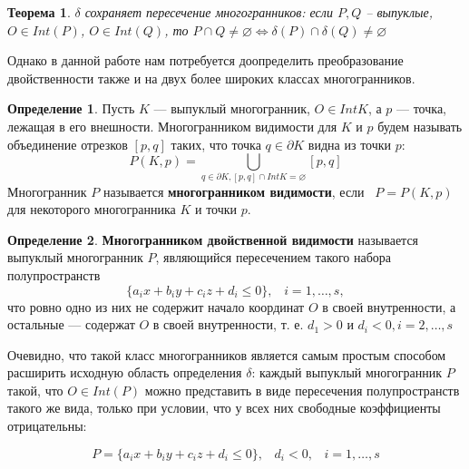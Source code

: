 \documentclass[a4paper, 10pt]{article}
\theoremstyle{definition}
\newtheorem{SmartDefinition}{Определение}
\theoremstyle{plain}
\newtheorem{SmartTheorem}{Теорема}
\theoremstyle{plain}
\begin{document}
\begin{SmartTheorem}
\label{theorem:intersection-saving}
 $\delta$ сохраняет пересечение многогранников: если $P, Q$ -- выпуклые,
 $O \in Int(P)$, $O \in Int(Q)$, то
 $P \cap Q \neq \varnothing \Leftrightarrow
 \delta(P) \cap \delta(Q) \neq \varnothing$
\end{SmartTheorem}

Однако в данной работе нам потребуется доопределить преобразование
двойственности также и на двух более широких классах многогранников.

\begin{SmartDefinition}
 Пусть $K$ --- выпуклый многогранник, $O \in Int K$, а $p$ --- точка, лежащая в
 его внешности. Многогранником видимости для $K$ и $p$ будем называть
 объединение отрезков $[p, q]$ таких, что точка $q \in \partial K$ видна из
 точки $p$:
 \begin{equation*}
  P(K, p) = \bigcup \limits_{q \in \partial K, [p, q] \cap Int K = \varnothing}
  [p, q]
 \end{equation*}
Многогранник $P$ называется \textbf{многогранником видимости}, если \
$P = P(K, p)$ для некоторого многогранника $K$ и точки $p$.
\end{SmartDefinition}

\begin{SmartDefinition}
 \textbf{Многогранником двойственной видимости} называется выпуклый
 многогранник $P$, являющийся пересечением такого набора полупространств
 \begin{equation}
 \label{equation:halfspace}
  \{a_{i} x + b_{i} y + c_{i} z + d_{i} \leq 0 \}, \;\;\; i = 1, \ldots, s,
 \end{equation}
 что ровно одно из них не содержит начало координат $O$ в своей внутренности, а
 остальные --- содержат $O$ в своей внутренности, т. е. $d_{1} > 0$ и
 $d_{i} < 0, i = 2, \ldots, s$
\end{SmartDefinition}

Очевидно, что такой класс многогранников является самым простым способом
расширить исходную область определения $\delta$: каждый выпуклый многогранник
$P$ такой, что $O \in Int(P)$ можно представить в виде пересечения
полупространств такого же вида, только при условии, что у всех них свободные
коэффициенты отрицательны:

\begin{equation*}
 P = \{a_{i} x + b_{i} y + c_{i} z + d_{i} \leq 0 \}, \;\;\;
 d_{i} < 0, \;\;\;
 i = 1, \ldots, s
\end{equation*}
\end{document}

